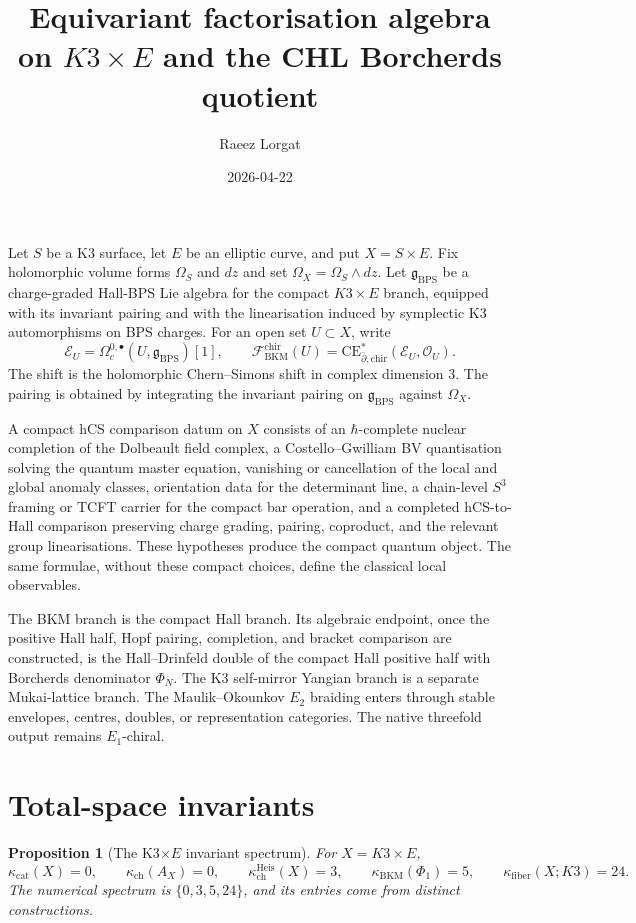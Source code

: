 \documentclass[11pt]{amsart}
\title{Equivariant factorisation algebra on $K3\times E$ and the CHL
Borcherds quotient}
\author{Raeez Lorgat}
\date{2026-04-22}
\providecommand{\dbar}{\bar{\partial}}
\providecommand{\gBPS}{\mathfrak{g}_{\mathrm{BPS}}}
\providecommand{\CE}{\mathrm{CE}}
\providecommand{\chir}{\mathrm{chir}}
\providecommand{\cE}{\mathcal{E}}
\providecommand{\cF}{\mathcal{F}}
\providecommand{\cO}{\mathcal{O}}
\providecommand{\kch}{\kappa_{\mathrm{ch}}}
\providecommand{\kBKM}{\kappa_{\mathrm{BKM}}}
\providecommand{\kcat}{\kappa_{\mathrm{cat}}}
\providecommand{\kfib}{\kappa_{\mathrm{fiber}}}
\theoremstyle{plain}
\newtheorem{proposition}[theorem]{Proposition}
\theoremstyle{definition}
\theoremstyle{remark}
\begin{document}
\maketitle

Let $S$ be a K3 surface, let $E$ be an elliptic curve, and put
$X=S\times E$. Fix holomorphic volume forms $\Omega_S$ and $dz$ and set
$\Omega_X=\Omega_S\wedge dz$. Let $\gBPS$ be a charge-graded Hall-BPS
Lie algebra for the compact $K3\times E$ branch, equipped with its
invariant pairing and with the linearisation induced by symplectic K3
automorphisms on BPS charges. For an open set $U\subset X$, write
\[
 \cE_U=\Omega_c^{0,\bullet}(U,\gBPS)[1],
 \qquad
 \cF^{\chir}_{\mathrm{BKM}}(U)
 =\CE^*_{\dbar,\chir}(\cE_U,\cO_U).
\]
The shift is the holomorphic Chern--Simons shift in complex dimension
$3$. The pairing is obtained by integrating the invariant pairing on
$\gBPS$ against $\Omega_X$.

A compact hCS comparison datum on $X$ consists of an
$\hbar$-complete nuclear completion of the Dolbeault field complex, a
Costello--Gwilliam BV quantisation solving the quantum master equation,
vanishing or cancellation of the local and global anomaly classes,
orientation data for the determinant line, a chain-level $S^3$ framing
or TCFT carrier for the compact bar operation, and a completed
hCS-to-Hall comparison preserving charge grading, pairing, coproduct,
and the relevant group linearisations. These hypotheses produce the
compact quantum object. The same formulae, without these compact
choices, define the classical local observables.

The BKM branch is the compact Hall branch. Its algebraic endpoint, once
the positive Hall half, Hopf pairing, completion, and bracket comparison
are constructed, is the Hall--Drinfeld double of the compact Hall
positive half with Borcherds denominator $\Phi_N$. The K3 self-mirror
Yangian branch is a separate Mukai-lattice branch. The
Maulik--Okounkov $E_2$ braiding enters through stable envelopes,
centres, doubles, or representation categories. The native threefold
output remains $E_1$-chiral.

\section{Total-space invariants}

\begin{proposition}[The K3$\times E$ invariant spectrum]\label{prop:k3e-four-invariants}
For $X=K3\times E$,
\[
 \kcat(X)=0,\qquad
 \kch(A_X)=0,\qquad
 \kch^{\mathrm{Heis}}(X)=3,\qquad
 \kBKM(\Phi_1)=5,\qquad
 \kfib(X;K3)=24.
\]
The numerical spectrum is $\{0,3,5,24\}$, and its entries come from
distinct constructions.
\end{proposition}
\end{document}
